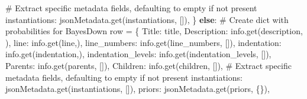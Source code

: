\documentclass[
  11pt,
  letterpaper,
]{book}
\newenvironment{Shaded}{\begin{snugshade}}{\end{snugshade}}
\newcommand{\CommentTok}[1]{\textcolor[rgb]{0.37,0.37,0.37}{#1}}
\newcommand{\ControlFlowTok}[1]{\textcolor[rgb]{0.00,0.23,0.31}{\textbf{#1}}}
\newcommand{\NormalTok}[1]{\textcolor[rgb]{0.00,0.23,0.31}{#1}}
\newcommand{\OperatorTok}[1]{\textcolor[rgb]{0.37,0.37,0.37}{#1}}
\newcommand{\StringTok}[1]{\textcolor[rgb]{0.13,0.47,0.30}{#1}}
\begin{document}
\begin{Shaded}
\begin{Highlighting}[]
                            \CommentTok{\# Extract specific metadata fields, defaulting to empty if not present}
                            \StringTok{\textquotesingle{}instantiations\textquotesingle{}}\NormalTok{: jsonMetadata.get(}\StringTok{\textquotesingle{}instantiations\textquotesingle{}}\NormalTok{, []),}
\NormalTok{                        \}}
                    \ControlFlowTok{else}\NormalTok{:}
                        \CommentTok{\# Create dict with probabilities for BayesDown}
\NormalTok{                        row }\OperatorTok{=}\NormalTok{ \{}
                            \StringTok{\textquotesingle{}Title\textquotesingle{}}\NormalTok{: title,}
                            \StringTok{\textquotesingle{}Description\textquotesingle{}}\NormalTok{: info.get(}\StringTok{\textquotesingle{}description\textquotesingle{}}\NormalTok{, }\StringTok{\textquotesingle{}\textquotesingle{}}\NormalTok{),}
                            \StringTok{\textquotesingle{}line\textquotesingle{}}\NormalTok{: info.get(}\StringTok{\textquotesingle{}line\textquotesingle{}}\NormalTok{,}\StringTok{\textquotesingle{}\textquotesingle{}}\NormalTok{),}
                            \StringTok{\textquotesingle{}line\_numbers\textquotesingle{}}\NormalTok{: info.get(}\StringTok{\textquotesingle{}line\_numbers\textquotesingle{}}\NormalTok{, []),}
                            \StringTok{\textquotesingle{}indentation\textquotesingle{}}\NormalTok{: info.get(}\StringTok{\textquotesingle{}indentation\textquotesingle{}}\NormalTok{,}\StringTok{\textquotesingle{}\textquotesingle{}}\NormalTok{),}
                            \StringTok{\textquotesingle{}indentation\_levels\textquotesingle{}}\NormalTok{: info.get(}\StringTok{\textquotesingle{}indentation\_levels\textquotesingle{}}\NormalTok{, []),}
                            \StringTok{\textquotesingle{}Parents\textquotesingle{}}\NormalTok{: info.get(}\StringTok{\textquotesingle{}parents\textquotesingle{}}\NormalTok{, []),}
                            \StringTok{\textquotesingle{}Children\textquotesingle{}}\NormalTok{: info.get(}\StringTok{\textquotesingle{}children\textquotesingle{}}\NormalTok{, []),}
                            \CommentTok{\# Extract specific metadata fields, defaulting to empty if not present}
                            \StringTok{\textquotesingle{}instantiations\textquotesingle{}}\NormalTok{: jsonMetadata.get(}\StringTok{\textquotesingle{}instantiations\textquotesingle{}}\NormalTok{, []),}
                            \StringTok{\textquotesingle{}priors\textquotesingle{}}\NormalTok{: jsonMetadata.get(}\StringTok{\textquotesingle{}priors\textquotesingle{}}\NormalTok{, \{\}),}

\end{Highlighting}
\end{Shaded}
\end{document}
